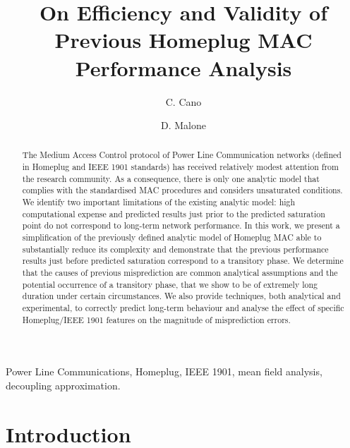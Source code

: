 \documentclass[preprint,12pt]{elsarticle}
\begin{document}
\begin{frontmatter}

\title{On Efficiency and Validity of Previous Homeplug MAC Performance Analysis}

\author{C. Cano}
\author{D. Malone}

\address{Hamilton Institute \\ National University of Ireland, Maynooth \\ Co. Kildare, Ireland.}

\begin{abstract}

The Medium Access Control protocol of Power Line Communication networks (defined in Homeplug and IEEE 1901 standards) has received relatively modest attention from the research community. As a consequence, there is only one analytic model that complies with the standardised MAC procedures and considers unsaturated conditions. We identify two important limitations of the existing analytic model: high computational expense and predicted results just prior to the predicted saturation point do not correspond to long-term network performance. In this work, we present a simplification of the previously defined analytic model of Homeplug MAC able to substantially reduce its complexity and demonstrate that the previous performance results just before predicted saturation correspond to a transitory phase. We determine that the causes of previous misprediction are common analytical assumptions and the potential occurrence of a transitory phase, that we show to be of extremely long duration under certain circumstances. We also provide techniques, both analytical and experimental, to correctly predict long-term behaviour and analyse the effect of specific Homeplug/IEEE 1901 features on the magnitude of misprediction errors.  

\end{abstract}

\begin{keyword} Power Line Communications, Homeplug, IEEE 1901, mean field analysis, decoupling approximation. \end{keyword}

\end{frontmatter}

\section{Introduction}
\end{document}
